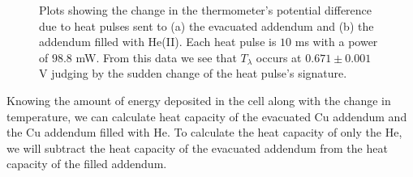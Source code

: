 \begin{figure}[htbp]
\begin{center}
\hspace{-1mm}
\vspace{-2mm}
\vspace{-2mm}
\caption{\small{Plots showing the change in the thermometer's potential difference due to heat pulses sent to (a) the evacuated addendum and (b) the addendum filled with He(II).  Each heat pulse is $10$ ms with a power of $98.8$ mW.  From this data we see that $T_{\lambda}$ occurs at $0.671 \pm 0.001$ V judging by the sudden change of the heat pulse's signature.}}
\label{fig:rawdata}
\end{center}
\end{figure}

Knowing the amount of energy deposited in the cell along with the change in temperature, we can calculate heat capacity of the evacuated Cu addendum and the Cu addendum filled with He.  To calculate the heat capacity of only the He, we will subtract the heat capacity of the evacuated addendum from the heat capacity of the filled addendum.  